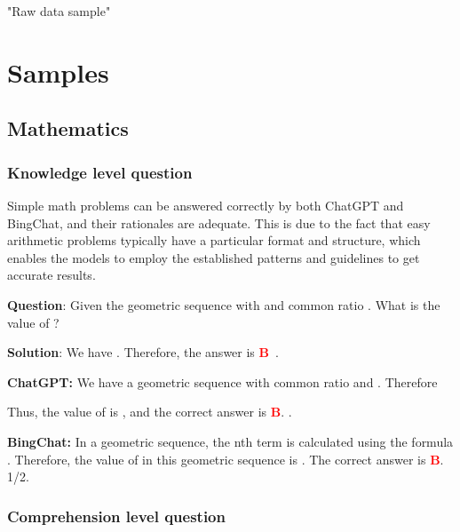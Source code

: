 \documentclass{article}
\begin{document}
{\begin{ProblemSpecBox}{"Raw data sample"}
		
		
	\end{ProblemSpecBox}
	
	\newpage	
	\section{Samples} 
	\label{Dataset_response}
	
	\subsection{Mathematics} 
	\label{VNHSGE_Math}
	
	\subsubsection{Knowledge level question}
	\label{VNHSGE_Math_K}
	
	Simple math problems can be answered correctly by both ChatGPT and BingChat, and their rationales are adequate. This is due to the fact that easy arithmetic problems typically have a particular format and structure, which enables the models to employ the established patterns and guidelines to get accurate results.  
	
	\begin{mdframed}[linewidth=1pt,linecolor=red] \textbf{Question}: Given the geometric sequence  with  and common ratio . What is the value of ?
		
		\begin{oneparchoices}
			\choice 
			\choice 
			\choice 
		\end{oneparchoices}
		
		\textbf{Solution}: We have . Therefore, the answer is \textcolor{red}{\textbf{B}}~.
		
		\textbf{ChatGPT:} We have a geometric sequence  with common ratio  and . Therefore
		
		Thus, the value of  is , and the correct answer is \textcolor{red}{\textbf{B}}. .
		
		\textbf{BingChat:} In a geometric sequence, the nth term is calculated using the formula . Therefore, the value of  in this geometric sequence is . The correct answer is \textcolor{red}{\textbf{B}}. 1/2.
		
	\end{mdframed}
	
	\subsubsection{Comprehension level question} 
	\label{VNHSGE_Math_C}
	
}
\end{document}
